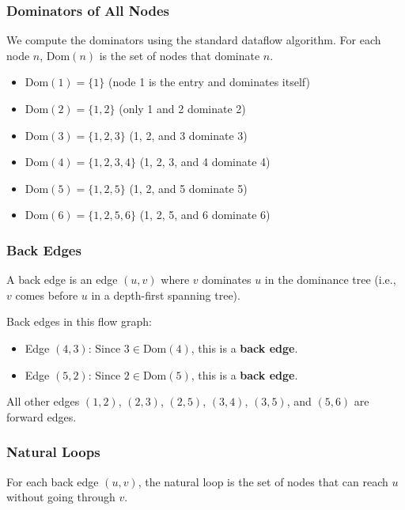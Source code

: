 \subsubsection{Dominators of All Nodes}

We compute the dominators using the standard dataflow algorithm. For each node $n$, $\mathrm{Dom}(n)$ is the set of nodes that dominate $n$.

\begin{itemize}
    \item $\mathrm{Dom}(1) = \{1\}$ \quad (node 1 is the entry and dominates itself)
    \item $\mathrm{Dom}(2) = \{1, 2\}$ \quad (only 1 and 2 dominate 2)
    \item $\mathrm{Dom}(3) = \{1, 2, 3\}$ \quad (1, 2, and 3 dominate 3)
    \item $\mathrm{Dom}(4) = \{1, 2, 3, 4\}$ \quad (1, 2, 3, and 4 dominate 4)
    \item $\mathrm{Dom}(5) = \{1, 2, 5\}$ \quad (1, 2, and 5 dominate 5)
    \item $\mathrm{Dom}(6) = \{1, 2, 5, 6\}$ \quad (1, 2, 5, and 6 dominate 6)
\end{itemize}

\subsubsection{Back Edges}

A back edge is an edge $(u, v)$ where $v$ dominates $u$ in the dominance tree (i.e., $v$ comes before $u$ in a depth-first spanning tree).

Back edges in this flow graph:
\begin{itemize}
    \item Edge $(4, 3)$: Since $3 \in \mathrm{Dom}(4)$, this is a \textbf{back edge}.
    \item Edge $(5, 2)$: Since $2 \in \mathrm{Dom}(5)$, this is a \textbf{back edge}.
\end{itemize}

All other edges $(1,2)$, $(2,3)$, $(2,5)$, $(3,4)$, $(3,5)$, and $(5,6)$ are forward edges.

\subsubsection{Natural Loops}

For each back edge $(u, v)$, the natural loop is the set of nodes that can reach $u$ without going through $v$.

